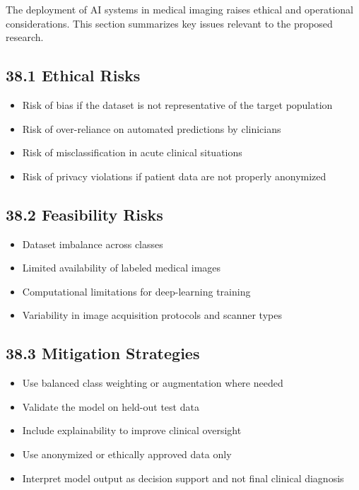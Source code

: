\documentclass[12pt,a4paper]{report}
\begin{document}
The deployment of AI systems in medical imaging raises ethical and operational considerations. This section summarizes key issues relevant to the proposed research.

\subsection{38.1 Ethical Risks}

\begin{itemize}
\item Risk of bias if the dataset is not representative of the target population
\item Risk of over-reliance on automated predictions by clinicians
\item Risk of misclassification in acute clinical situations
\item Risk of privacy violations if patient data are not properly anonymized
\end{itemize}

\subsection{38.2 Feasibility Risks}

\begin{itemize}
\item Dataset imbalance across classes
\item Limited availability of labeled medical images
\item Computational limitations for deep-learning training
\item Variability in image acquisition protocols and scanner types
\end{itemize}

\subsection{38.3 Mitigation Strategies}

\begin{itemize}
\item Use balanced class weighting or augmentation where needed
\item Validate the model on held-out test data
\item Include explainability to improve clinical oversight
\item Use anonymized or ethically approved data only
\item Interpret model output as decision support and not final clinical diagnosis
\end{itemize}
\end{document}

